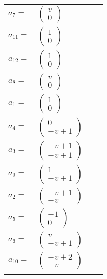 \documentclass[1p]{elsarticle_modified}
\theoremstyle{definition}
\begin{document}
\begin{tabular}{m{7pt} m{180pt} m{7pt} m{180pt} }
\flushright $a_{7}=$&$\begin{pmatrix}v\\0\end{pmatrix}$ \\
\flushright $a_{11}=$&$\begin{pmatrix}1\\0\end{pmatrix}$ \\
\flushright $a_{12}=$&$\begin{pmatrix}1\\0\end{pmatrix}$ \\
\flushright $a_{8}=$&$\begin{pmatrix}v\\0\end{pmatrix}$ \\
\flushright $a_{1}=$&$\begin{pmatrix}1\\0\end{pmatrix}$ \\
\flushright $a_{4}=$&$\begin{pmatrix}0\\- v+1\end{pmatrix}$ \\
\flushright $a_{3}=$&$\begin{pmatrix}- v+1\\- v+1\end{pmatrix}$ \\
\flushright $a_{9}=$&$\begin{pmatrix}1\\- v+1\end{pmatrix}$ \\
\flushright $a_{2}=$&$\begin{pmatrix}- v+1\\- v\end{pmatrix}$ \\
\flushright $a_{5}=$&$\begin{pmatrix}-1\\0\end{pmatrix}$ \\
\flushright $a_{6}=$&$\begin{pmatrix}v\\- v+1\end{pmatrix}$ \\
\flushright $a_{10}=$&$\begin{pmatrix}- v+2\\- v\end{pmatrix}$\\&\end{tabular}
\end{document}

